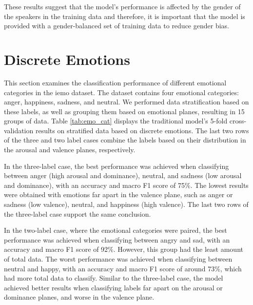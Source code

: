 These results suggest that the model's performance is affected by the gender of the speakers in the training data and therefore, it is important that the model is provided with a gender-balanced set of training data to reduce gender bias.

\section{Discrete Emotions}

This section examines the classification performance of different emotional categories in the \ac{iemo} dataset. The dataset contains four emotional categories: anger, happiness, sadness, and neutral. We performed data stratification based on these labels, as well as grouping them based on emotional planes, resulting in 15 groups of data. Table \ref{tab:emo_cat} displays the traditional model's 5-fold cross-validation results on stratified data based on discrete emotions. The last two rows of the three and two label cases combine the labels based on their distribution in the arousal and valence planes, respectively.

In the three-label case, the best performance was achieved when classifying between anger (high arousal and dominance), neutral, and sadness (low arousal and dominance), with an accuracy and macro F1 score of 75\%. The lowest results were obtained with emotions far apart in the valence plane, such as anger or sadness (low valence), neutral, and happiness (high valence). The last two rows of the three-label case support the same conclusion.

In the two-label case, where the emotional categories were paired, the best performance was achieved when classifying between angry and sad, with an accuracy and macro F1 score of 92\%. However, this group had the least amount of total data. The worst performance was achieved when classifying between neutral and happy, with an accuracy and macro F1 score of around 73\%, which had more total data to classify. Similar to the three-label case, the model achieved better results when classifying labels far apart on the arousal or dominance planes, and worse in the valence plane.

